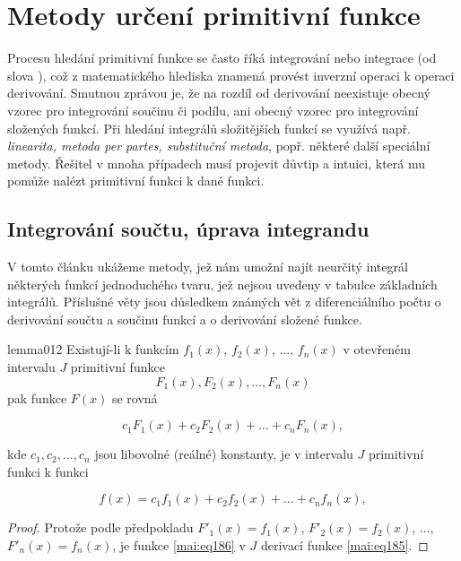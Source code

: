   \section{Metody určení primitivní funkce}\label{mai:IchapVIIsecIII}
    Procesu hledání primitivní funkce se často říká integrování nebo integrace (od slova
    ), což z matematického hlediska znamená provést inverzní operaci k operaci
    derivování. Smutnou zprávou je, že na rozdíl od derivování neexistuje obecný vzorec pro
    integrování součinu či podílu, ani obecný vzorec pro integrování složených funkcí. Při hledání
    integrálů složitějších funkcí se využívá např. \emph{linearita, metoda per partes, substituční
    metoda}, popř. některé další speciální metody. Řešitel v mnoha případech musí projevit důvtip
    a intuici, která mu pomůže nalézt primitivní funkci k dané funkci.

    \subsection{Integrování součtu, úprava integrandu}\label{mai:IchapVIIsecIIIssecI}  
      V tomto článku ukážeme metody, jež nám umožní najít neurčitý integrál některých funkcí
      jednoduchého tvaru, jež nejsou uvedeny v tabulce základních integrálů. Příslušné věty jsou
      důsledkem známých vět z diferenciálního počtu o derivování součtu a součinu funkcí a o
      derivování složené funkce. 

      \begin{mathlemma}{}{lemma012}        
        Existují-li k funkcím \(f_1(x)\), \(f_2(x)\), \(\ldots\), \(f_n(x)\) v otevřeném
        intervalu \(J\) primitivní funkce \[F_1(x), F_2(x), \ldots, F_n(x)\] pak funkce \(F(x)\)
        se rovná
        \begin{fleqn}[0pt]
          \begin{equation}\label{mai:eq185}
            c_1F_1(x) + c_2F_2(x) + \ldots + c_nF_n(x),
          \end{equation}
        \end{fleqn}
          kde \(c_1, c_2, \ldots, c_n\) jsou libovolné (reálné) konstanty, je v intervalu \(J\)
          primitivní funkci k funkci 
          \begin{fleqn}[0pt]
            \begin{equation}\label{mai:eq186}
              f(x) = c_1f_1(x) + c_2f_2(x) + \ldots + c_nf_n(x),
            \end{equation}
          \end{fleqn}
        \useshortskip
        \tcblower
        \begin{proof}
          Protože podle předpokladu \(F'_1(x) = f_1(x)\), \(F'_2(x) = f_2(x)\), \(\ldots\),
          \(F'_n(x) = f_n(x)\), je funkce \eqref{mai:eq186} v \(J\) derivací funkce
          \eqref{mai:eq185}.
        \end{proof}
      \end{mathlemma}

